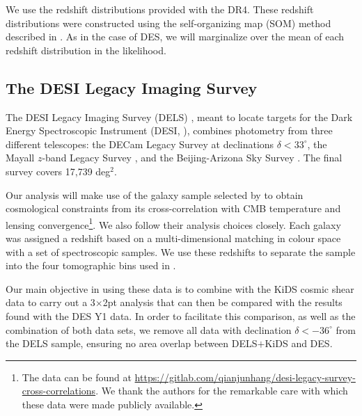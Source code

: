 \documentclass[a4paper,11pt]{article}
\newcommand{\des}{DES\xspace}
\newcommand{\kids}{KiDS\xspace}
\newcommand{\dls}{DELS\xspace}
\begin{document}
      We use the redshift distributions provided with the DR4. These redshift distributions were constructed using the self-organizing map (SOM) method described in \cite{1909.09632,2007.15635}. As in the case of \des, we will marginalize over the mean of each redshift distribution in the likelihood.

    \subsection{The DESI Legacy Imaging Survey}\label{ssec:data.dls}
      The DESI Legacy Imaging Survey (\dls) \cite{1804.08657}, meant to locate targets for the Dark Energy Spectroscopic Instrument (DESI, \cite{1308.0847}), combines photometry from three different telescopes: the DECam Legacy Survey \cite{1504.02900,2016AAS...22831701B} at declinations $\delta<33^\circ$, the Mayall $z$-band Legacy Survey \cite{10.1117/12.2231488,2016AAS...22831702S}, and the Beijing-Arizona Sky Survey \cite{10.1117/12.552189,1908.07099}. The final survey covers 17,739 deg$^2$.
      
      Our analysis will make use of the galaxy sample selected by \cite{2010.00466} to obtain cosmological constraints from its cross-correlation with CMB temperature and lensing convergence\footnote{The data can be found at \url{https://gitlab.com/qianjunhang/desi-legacy-survey-cross-correlations}. We thank the authors for the remarkable care with which these data were made publicly available.}. We also follow their analysis choices closely. Each galaxy was assigned a redshift based on a multi-dimensional matching in colour space with a set of spectroscopic samples. We use these redshifts to separate the sample into the four tomographic bins used in \cite{2010.00466}.

      Our main objective in using these data is to combine with the \kids cosmic shear data to carry out a 3$\times$2pt analysis that can then be compared with the results found with the \des Y1 data. In order to facilitate this comparison, as well as the combination of both data sets, we remove all data with declination $\delta<-36^\circ$ from the \dls sample, ensuring no area overlap between \dls$+$\kids and \des.
\end{document}
